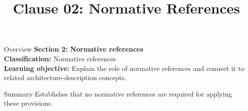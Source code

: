 \documentclass[10pt,letterpaper]{article}
\title{Clause 02: Normative References}
\author{}
\date{}
\begin{document}
\maketitle
\begin{CornellOverviewBox}{Overview}
{\Large\bfseries\textcolor{CNavy}{Section 2: Normative references}}\\[3pt]
{\small\textbf{Classification:} Normative references}\\
{\small\textbf{Learning objective:} Explain the role of normative references and connect it to related architecture-description concepts.}
\end{CornellOverviewBox}
\vspace{3pt}

\begin{CornellNotesTable}
\end{CornellNotesTable}


\begin{CornellSummaryBox}{Summary}
Establishes that no normative references are required for applying these provisions.
\end{CornellSummaryBox}
\end{document}
